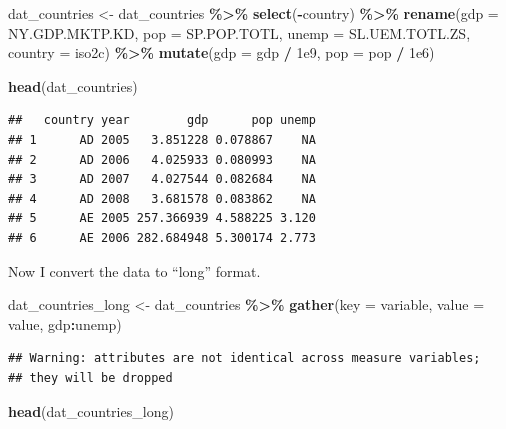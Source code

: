 \documentclass[
  12pt,
  oneside,openany]{book}
\newenvironment{Shaded}{\begin{snugshade}}{\end{snugshade}}
\newcommand{\DataTypeTok}[1]{\textcolor[rgb]{0.13,0.29,0.53}{#1}}
\newcommand{\FloatTok}[1]{\textcolor[rgb]{0.00,0.00,0.81}{#1}}
\newcommand{\KeywordTok}[1]{\textcolor[rgb]{0.13,0.29,0.53}{\textbf{#1}}}
\newcommand{\NormalTok}[1]{#1}
\newcommand{\OperatorTok}[1]{\textcolor[rgb]{0.81,0.36,0.00}{\textbf{#1}}}
\newcommand{\StringTok}[1]{\textcolor[rgb]{0.31,0.60,0.02}{#1}}
\begin{document}
\begin{Shaded}
\begin{Highlighting}[]
\NormalTok{dat\_countries \textless{}{-}}\StringTok{ }\NormalTok{dat\_countries }\OperatorTok{\%\textgreater{}\%}
\StringTok{  }\KeywordTok{select}\NormalTok{(}\OperatorTok{{-}}\NormalTok{country) }\OperatorTok{\%\textgreater{}\%}
\StringTok{  }\KeywordTok{rename}\NormalTok{(}\DataTypeTok{gdp =}\NormalTok{ NY.GDP.MKTP.KD,}
         \DataTypeTok{pop =}\NormalTok{ SP.POP.TOTL,}
         \DataTypeTok{unemp =}\NormalTok{ SL.UEM.TOTL.ZS,}
         \DataTypeTok{country =}\NormalTok{ iso2c) }\OperatorTok{\%\textgreater{}\%}
\StringTok{  }\KeywordTok{mutate}\NormalTok{(}\DataTypeTok{gdp =}\NormalTok{ gdp }\OperatorTok{/}\StringTok{ }\FloatTok{1e9}\NormalTok{,}
         \DataTypeTok{pop =}\NormalTok{ pop }\OperatorTok{/}\StringTok{ }\FloatTok{1e6}\NormalTok{)}

\KeywordTok{head}\NormalTok{(dat\_countries)}
\end{Highlighting}
\end{Shaded}

\begin{verbatim}
##   country year        gdp      pop unemp
## 1      AD 2005   3.851228 0.078867    NA
## 2      AD 2006   4.025933 0.080993    NA
## 3      AD 2007   4.027544 0.082684    NA
## 4      AD 2008   3.681578 0.083862    NA
## 5      AE 2005 257.366939 4.588225 3.120
## 6      AE 2006 282.684948 5.300174 2.773
\end{verbatim}

Now I convert the data to ``long'' format.

\begin{Shaded}
\begin{Highlighting}[]
\NormalTok{dat\_countries\_long \textless{}{-}}\StringTok{ }\NormalTok{dat\_countries }\OperatorTok{\%\textgreater{}\%}
\StringTok{  }\KeywordTok{gather}\NormalTok{(}\DataTypeTok{key =}\NormalTok{ variable,}
         \DataTypeTok{value =}\NormalTok{ value,}
\NormalTok{         gdp}\OperatorTok{:}\NormalTok{unemp)}
\end{Highlighting}
\end{Shaded}

\begin{verbatim}
## Warning: attributes are not identical across measure variables;
## they will be dropped
\end{verbatim}

\begin{Shaded}
\begin{Highlighting}[]
\KeywordTok{head}\NormalTok{(dat\_countries\_long)}
\end{Highlighting}
\end{Shaded}
\end{document}
